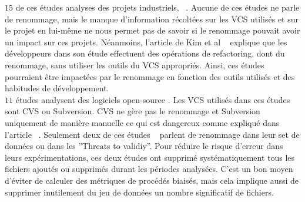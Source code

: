 $15$ de ces études analyses des projets industriels, ~\cite{arisholm_systematic_2010,graves_predicting_2000,khoshgoftaar_using_2000,layman_iterative_2008,munson_code_1998,nagappan_use_2005,nagappan_influence_2008,nagappan_using_2007,nagappan_using_2006,nagappan_change_2010,nikora_building_2006,ostrand_programmer-based_2010,weyuker_too_2008,weyuker_using_2007,yuan_application_2000}. Aucune de ces études ne parle de renommage, mais le manque d'information récoltées sur les VCS utilisés et sur le projet en lui-même ne nous permet pas de savoir si le renommage pouvait avoir un impact sur ces projets. Néanmoins, l'article de Kim et al ~\cite{kim_field_2012} explique que les développeurs dans son étude effectuent des opérations de refactoring, dont du renommage, sans utiliser les outils du VCS appropriés. Ainsi, ces études pourraient être impactées par le renommage en fonction des outils utilisés et des habitudes de développement.\\

$11$ études analysent des logiciels open-source \cite{dambros_relationship_2009,bacchelli_are_2010,caglayan_merits_2009,dambros_evaluating_2012,dambros_evaluating_2012,dambros_extensive_2010,illes-seifert_exploring_2010,li_finding_2005,matsumoto_analysis_2010,moser_analysis_2008,moser_comparative_2008,schroter_if_2006}. Les VCS utilisés dans ces études sont CVS ou Subversion. CVS ne gère pas le renommage et Subversion uniquement de manière manuelle ce qui est dangereux comme expliqué dans l'article ~\cite{lavoie_inferring_2012,steidl_incremental_2014}. Seulement deux de ces études ~\cite{moser_analysis_2008,moser_comparative_2008} parlent de renommage dans leur set de données ou dans les ''Threats to validiy''. Pour réduire le risque d'erreur dans leurs expérimentations, ces deux études ont supprimé systématiquement tous les fichiers ajoutés ou supprimés durant les périodes analysées. C'est un bon moyen d'éviter de calculer des métriques de procédés biaisés, mais cela implique aussi de supprimer inutilement du jeu de données un nombre significatif de fichiers.\\

